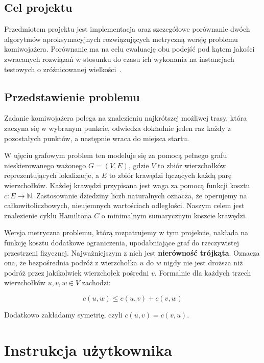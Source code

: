 \documentclass{article}
\theoremstyle{definition}
\theoremstyle{plain}
\theoremstyle{remark}
\begin{document}
\subsection{Cel projektu}

Przedmiotem projektu jest implementacja oraz szczegółowe porównanie dwóch algorytmów aproksymacyjnych rozwiązujących metryczną wersję problemu komiwojażera. Porównanie ma na celu ewaluację obu podejść pod kątem jakości zwracanych rozwiązań w stosunku do czasu ich wykonania na instancjach testowych o zróżnicowanej wielkości~\cite{dokumentacja_wstepna_tsp}.

\subsection{Przedstawienie problemu}

Zadanie komiwojażera polega na znalezieniu najkrótszej możliwej trasy, która zaczyna się w wybranym punkcie, odwiedza dokładnie jeden raz każdy z pozostałych punktów, a następnie wraca do miejsca startu.

W ujęciu grafowym problem ten modeluje się za pomocą pełnego grafu nieskierowanego ważonego $G = (V, E)$, gdzie $V$ to zbiór wierzchołków reprezentujących lokalizacje, a $E$ to zbiór krawędzi łączących każdą parę wierzchołków. Każdej krawędzi przypisana jest waga za pomocą funkcji kosztu $c: E \to \mathbb{N}$. Zastosowanie dziedziny liczb naturalnych oznacza, że operujemy na całkowitoliczbowych, nieujemnych wartościach odległości. Naszym celem jest znalezienie cyklu Hamiltona $C$ o minimalnym sumarycznym koszcie krawędzi.

Wersja metryczna problemu, którą rozpatrujemy w tym projekcie, nakłada na funkcję kosztu dodatkowe ograniczenia, upodabniające graf do rzeczywistej przestrzeni fizycznej. Najważniejszym z nich jest \textbf{nierówność trójkąta}. Oznacza ona, że bezpośrednia podróż z wierzchołka $u$ do $w$ nigdy nie jest droższa niż podróż przez jakikolwiek wierzchołek pośredni $v$. Formalnie dla każdych trzech wierzchołków $u, v, w \in V$ zachodzi:

$$c(u, w) \le c(u, v) + c(v, w)$$

\noindent
Dodatkowo zakładamy symetrię, czyli $c(u, v) = c(v, u)$.

\newpage
	
\newpage
\section{Instrukcja użytkownika}
\end{document}
